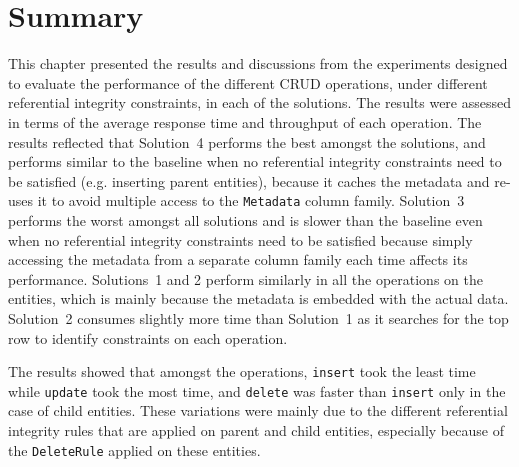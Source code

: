 




\section{Summary} \label{s:results-summary}

This chapter presented the results and discussions from the experiments designed
to evaluate the performance of the different \ac{CRUD} operations, under
different referential integrity constraints, in each of the solutions.
The results were assessed in terms of the average response time and throughput
of each operation. The results reflected that Solution~4 performs the best
amongst the solutions, and performs similar to the baseline when no referential
integrity constraints need to be satisfied (e.g. inserting parent entities),
because it caches the metadata and re-uses it to avoid multiple access to the
\texttt{Metadata} column family.
Solution~3 performs the worst amongst all solutions and is slower than the
baseline even when no referential integrity constraints need to be satisfied
because simply accessing the metadata from a separate column family each time affects
its performance.
Solutions~1 and 2 perform similarly in all the operations on the entities, which
is mainly because the metadata is embedded with the actual data.   Solution~2
consumes slightly more time than Solution~1 as it searches for the top row to
identify constraints on each operation.

The results showed that amongst the operations,   \texttt{insert} took the least
time while \texttt{update} took the most time,   and \texttt{delete} was faster
than \texttt{insert} only in the case of child entities.   These variations were
mainly due to the different referential integrity rules that are applied on
parent and child entities,   especially because of the \texttt{DeleteRule}
applied on these entities.  
	
